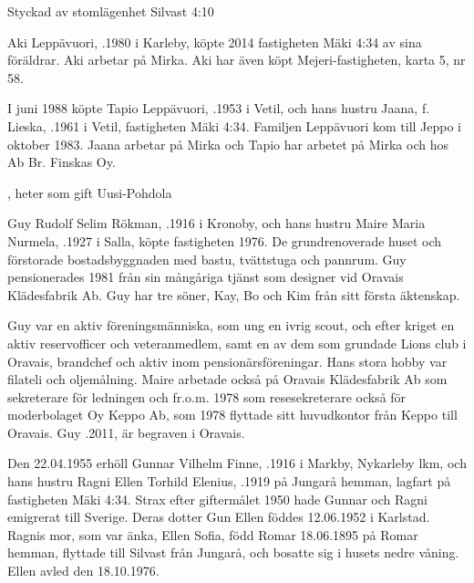%

Styckad av stomlägenhet Silvast 4:10


%
Aki Leppävuori, .1980 i Karleby, köpte 2014 fastigheten Mäki 4:34 av sina föräldrar. Aki arbetar på Mirka. Aki har även köpt Mejeri-fastigheten, karta 5, nr 58.\jhvspace{}


%
I juni 1988 köpte Tapio Leppävuori, .1953 i Vetil, och	hans hustru Jaana, f. Lieska, .1961 i Vetil, fastigheten Mäki 4:34. Familjen Leppävuori kom till Jeppo i oktober 1983. Jaana arbetar på Mirka och Tapio har arbetet på Mirka och hos Ab Br. Finskas Oy.
\begin{jhchildren}
  \item {}
  \item {}, heter som gift Uusi-Pohdola
\end{jhchildren}


%
Guy Rudolf Selim Rökman, .1916 i Kronoby, och hans hustru Maire Maria Nurmela, .1927 i Salla, köpte fastigheten 1976. De grundrenoverade huset och förstorade bostadsbyggnaden med bastu, tvättstuga och pannrum. Guy pensionerades 1981 från sin mångåriga tjänst som designer vid Oravais Klädesfabrik Ab. Guy har tre söner, Kay, Bo och Kim från sitt första äktenskap.

Guy var en aktiv föreningsmänniska, som ung en ivrig scout, och efter kriget en aktiv reservofficer och veteranmedlem, samt en av dem som 	grundade Lions club i Oravais, brandchef och aktiv inom pensionärsföreningar. Hans stora hobby var filateli och oljemålning.	Maire arbetade också på Oravais Klädesfabrik Ab som sekreterare för ledningen och fr.o.m. 1978 som resesekreterare också för moderbolaget Oy Keppo Ab, som 1978 flyttade sitt huvudkontor från Keppo till Oravais. Guy .2011, är begraven i Oravais.


%
Den 22.04.1955 erhöll Gunnar Vilhelm Finne, .1916 i Markby, Nykarleby lkm, och hans hustru Ragni Ellen Torhild Elenius, .1919 på Jungarå hemman, lagfart på fastigheten Mäki 4:34. Strax efter giftermålet 1950 hade Gunnar och Ragni emigrerat till Sverige. Deras dotter Gun Ellen föddes 12.06.1952 i Karlstad. Ragnis mor, som var änka, Ellen Sofia, född Romar 18.06.1895 på Romar hemman, flyttade till Silvast från Jungarå, och bosatte sig i husets nedre våning. Ellen avled den 18.10.1976.

